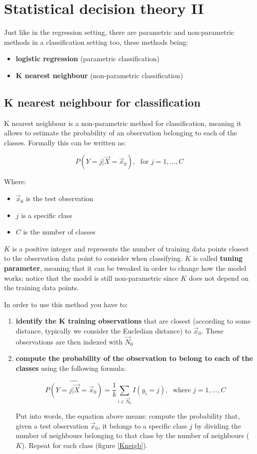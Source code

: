 \graphicspath{{chapters/images/0203/}}

\chapter{Statistical decision theory II}
  Just like in the regression setting, there are parametric and non-parametric methods in a classification setting too, these methods being:
  \begin{itemize}
    \item \textbf{logistic regression} (parametric classification)
    \item \textbf{K nearest neighbour} (non-parametric classification)
  \end{itemize}

  \section{K nearest neighbour for classification}
    K nearest neighbour is a non-parametric method for classification, meaning it allows to estimate the probability of an observation belonging to each of the classes. Formally this can be written as:

    $$P(Y = j | \vec{X} = \vec{x}_0), \; \text{ for } j = 1, \dots, C$$ 

    Where:
    \begin{itemize}
      \item $\vec{x}_0$ is the test observation
      \item $j$ is a specific class
      \item $C$ is the number of classes
    \end{itemize}
    
    $K$ is a positive integer and represents the number of training data points closest to the observation data point to consider when classifying. $K$ is called \textbf{tuning parameter}, meaning that it can be tweaked in order to change how the model works; notice that the model is still non-parametric since $K$ does not depend on the training data points.

    In order to use this method you have to: 
    \begin{enumerate}
      \item \textbf{identify the K training observations} that are closest (according to some distance, typically we consider the Eucledian distance) to $\vec{x}_0$. These observations  are then indexed with $\vec{N}_0$

      \item \textbf{compute the probability of the observation to belong to each of the classes} using the following formula:

      $$
      \hat{P(Y = j | \vec{X} = \vec{x}_0)} = \frac{1}{k}\sum_{i \in \vec{N}_0}{I(y_i = j)},\;
      \text{ where } j = 1, \dots, C
      $$

      Put into words, the equation above means: compute the probability that, given a test observation $\vec{x}_0$, it belongs to a specific class $j$ by dividing the number of neighbours belonging to that class by the number of neighbours ($K$). Repeat for each class (figure \ref{Kneigb}).
    \end{enumerate} 

